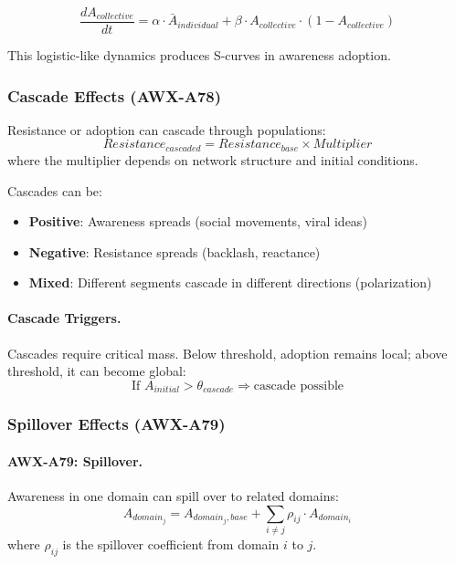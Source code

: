 \begin{equation}
\frac{dA_{collective}}{dt} = \alpha \cdot \bar{A}_{individual} + \beta \cdot A_{collective} \cdot (1 - A_{collective})
\end{equation}

This logistic-like dynamics produces S-curves in awareness adoption.

\subsubsection{Cascade Effects (AWX-A78)}

\begin{axiom}
Resistance or adoption can cascade through populations:
\begin{equation}
Resistance_{cascaded} = Resistance_{base} \times Multiplier
\end{equation}
where the multiplier depends on network structure and initial conditions.
\end{axiom}

Cascades can be:
\begin{itemize}
    \item \textbf{Positive}: Awareness spreads (social movements, viral ideas)
    \item \textbf{Negative}: Resistance spreads (backlash, reactance)
    \item \textbf{Mixed}: Different segments cascade in different directions 
          (polarization)
\end{itemize}

\paragraph{Cascade Triggers.}
Cascades require critical mass. Below threshold, adoption remains local; 
above threshold, it can become global:
\begin{equation}
\text{If } A_{initial} > \theta_{cascade} \Rightarrow \text{cascade possible}
\end{equation}

\subsubsection{Spillover Effects (AWX-A79)}

\paragraph{AWX-A79: Spillover.}
Awareness in one domain can spill over to related domains:
\begin{equation}
A_{domain_j} = A_{domain_j,base} + \sum_{i \neq j} \rho_{ij} \cdot A_{domain_i}
\end{equation}
where $\rho_{ij}$ is the spillover coefficient from domain $i$ to $j$.

